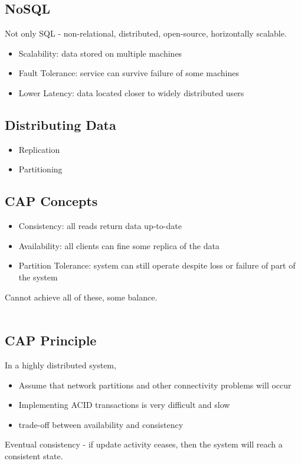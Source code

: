\documentclass[12pt,a4paper]{article} %
\begin{document}
\subsection{NoSQL}
Not only SQL - non-relational, distributed, open-source, horizontally scalable.
	\begin{itemize}
	\item Scalability: data stored on multiple machines
	\item Fault Tolerance: service can survive failure of some machines
	\item Lower Latency: data located closer to widely distributed users
	\end{itemize}
\subsection{Distributing Data}
	\begin{itemize}
	\item Replication
	\item Partitioning
	\end{itemize}
\subsection{CAP Concepts}
	\begin{itemize}
	\item Consistency: all reads return data up-to-date
	\item Availability: all clients can fine some replica of the data
	\item Partition Tolerance: system can still operate despite loss or failure of part of the system
	\end{itemize}
Cannot achieve all of these, some balance.
\\\\
\subsection{CAP Principle}

In a highly distributed system, 
	\begin{itemize}
	\item Assume that network partitions and other connectivity problems will occur
	\item Implementing ACID transactions is very difficult and slow
	\item trade-off between availability and consistency
	\end{itemize}
Eventual consistency - if update activity ceases, then the system will reach a consistent state.
\\\\
\end{document}
